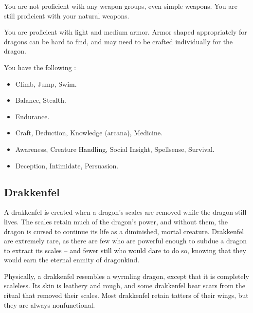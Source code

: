             You are not proficient with any weapon groups, even simple weapons.
            You are still proficient with your natural weapons.

            You are proficient with light and medium armor.
            Armor shaped appropriately for dragons can be hard to find, and may need to be crafted individually for the dragon.

            You have the following :
            \begin{itemize}
                \item {} Climb, Jump, Swim.
                \item {} Balance, Stealth.
                \item {} Endurance.
                \item {} Craft, Deduction, Knowledge (arcana), Medicine.
                \item {} Awareness, Creature Handling, Social Insight, Spellsense, Survival.
                \item {} Deception, Intimidate, Persuasion.
            \end{itemize}

    \subsection{Drakkenfel}

        A drakkenfel is created when a dragon's scales are removed while the dragon still lives. The scales retain much of the dragon's power, and without them, the dragon is cursed to continue its life as a diminished, mortal creature.
        Drakkenfel are extremely rare, as there are few who are powerful enough to subdue a dragon to extract its scales -- and fewer still who would dare to do so, knowing that they would earn the eternal enmity of dragonkind.

        Physically, a drakkenfel resembles a wyrmling dragon, except that it is completely scaleless.
        Its skin is leathery and rough, and some drakkenfel bear scars from the ritual that removed their scales.
        Most drakkenfel retain tatters of their wings, but they are always nonfunctional.

